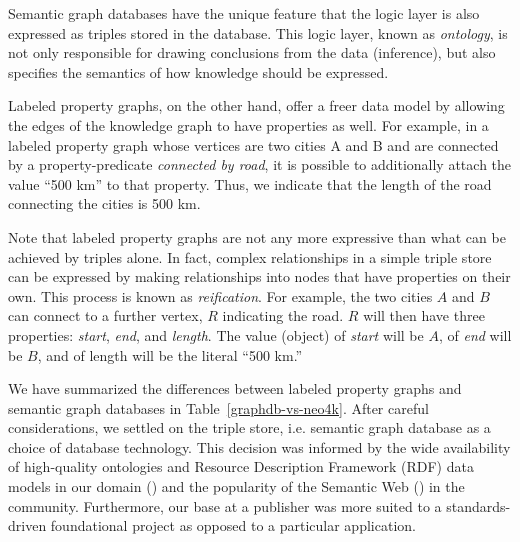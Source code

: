 Semantic graph databases have the unique feature that the logic layer is also expressed as triples stored in the database. This logic layer, known as \emph{ontology}, is not only responsible for drawing conclusions from the data (inference), but also specifies the semantics of how knowledge should be expressed.

Labeled property graphs, on the other hand, offer a freer data model by allowing the edges of the knowledge graph to have properties as well. For example, in a labeled property graph whose vertices are two cities A and B and are connected by a property-predicate \emph{connected by road}, it is possible to additionally attach the value ``500 km'' to that property. Thus, we indicate that the length of the road connecting the cities is 500 km.

Note that labeled property graphs are not any more expressive than what can be achieved by triples alone. In fact, complex relationships in a simple triple store can be expressed by making relationships into nodes that have properties on their own. This process is known as \emph{reification}. For example, the two cities $A$ and $B$ can connect to a further vertex, $R$ indicating the road. $R$ will then have three properties: \emph{start}, \emph{end}, and \emph{length}. The value (object) of \emph{start} will be $A$, of \emph{end} will be $B$, and of length will be the literal ``500 km.''

We have summarized the differences between labeled property graphs and semantic graph databases in Table~\ref{graphdb-vs-neo4k}. After careful considerations, we settled on the triple store, i.e. semantic graph database as a choice of database technology. This decision was informed by the wide availability of high-quality ontologies and Resource Description Framework (RDF) data models in our domain (\cite{baskauf_darwin-sw:_2016,peroni_semantic_2014}) and the popularity of the Semantic Web (\cite{berners-lee_semantic_2001}) in the community. Furthermore, our base at a publisher was more suited to a standards-driven foundational project as opposed to a particular application.

